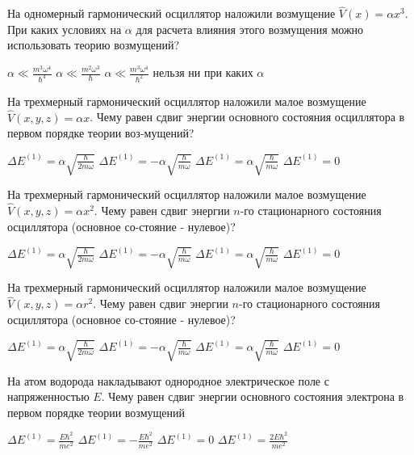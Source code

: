 \documentclass[11pt,a4paper]{exam}
\begin{document}
\begin{questions}
\question На одномерный гармонический осциллятор наложили возмущение $\hat V(x) = \alpha {x^3}$. При каких условиях на $\alpha $ для расчета влияния этого возмущения можно использовать теорию возмущений?
\begin{choices}
\choice $\alpha  \ll \frac{{{m^3}{\omega ^4}}}{{{\hbar ^4}}}$    
\choice $\alpha  \ll \frac{{{m^2}{\omega ^3}}}{\hbar }$    
\choice $\alpha  \ll \frac{{{m^3}{\omega ^4}}}{{{\hbar ^2}}}$    
\choice нельзя ни при каких $\alpha $
\end{choices}

\question На трехмерный гармонический осциллятор наложили малое возмущение $\hat V(x,y,z) = \alpha x$. Чему равен сдвиг энергии основного состояния осциллятора в первом порядке теории воз-мущений?
\begin{choices}
\choice $\Delta {E^{(1)}} = \alpha \sqrt {\frac{\hbar }{{2m\omega }}} $   
\choice $\Delta {E^{(1)}} =  - \alpha \sqrt {\frac{\hbar }{{m\omega }}} $ 
\choice $\Delta {E^{(1)}} = \alpha \sqrt {\frac{\hbar }{{m\omega }}} $ 
\choice $\Delta {E^{(1)}} = 0$
\end{choices}

\question На трехмерный гармонический осциллятор наложили малое возмущение $\hat V(x,y,z) = \alpha {x^2}$. Чему равен сдвиг энергии $n$-го стационарного состояния осциллятора (основное со-стояние - нулевое)?
\begin{choices}
\choice $\Delta {E^{(1)}} = \alpha \sqrt {\frac{\hbar }{{2m\omega }}} $   
\choice $\Delta {E^{(1)}} =  - \alpha \sqrt {\frac{\hbar }{{m\omega }}} $ 
\choice $\Delta {E^{(1)}} = \alpha \sqrt {\frac{\hbar }{{m\omega }}} $ 
\choice $\Delta {E^{(1)}} = 0$
\end{choices}

\question На трехмерный гармонический осциллятор наложили малое возмущение $\hat V(x,y,z) = \alpha {r^2}$. Чему равен сдвиг энергии $n$-го стационарного состояния осциллятора (основное со-стояние - нулевое)?
\begin{choices}
\choice $\Delta {E^{(1)}} = \alpha \sqrt {\frac{\hbar }{{2m\omega }}} $   
\choice $\Delta {E^{(1)}} =  - \alpha \sqrt {\frac{\hbar }{{m\omega }}} $ 
\choice $\Delta {E^{(1)}} = \alpha \sqrt {\frac{\hbar }{{m\omega }}} $ 
\choice $\Delta {E^{(1)}} = 0$
\end{choices}

\question На атом водорода накладывают однородное электрическое поле с напряженностью $E$. Чему равен сдвиг энергии основного состояния электрона в первом порядке теории возмущений
\begin{choices}
\choice $\Delta {E^{(1)}} = \frac{{E{\hbar ^2}}}{{m{e^2}}}$   
\choice $\Delta {E^{(1)}} =  - \frac{{E{\hbar ^2}}}{{m{e^2}}}$   
\choice $\Delta {E^{(1)}} = 0$     
\choice $\Delta {E^{(1)}} = \frac{{2E{\hbar ^2}}}{{m{e^2}}}$
\end{choices}


\end{questions}
\end{document}
